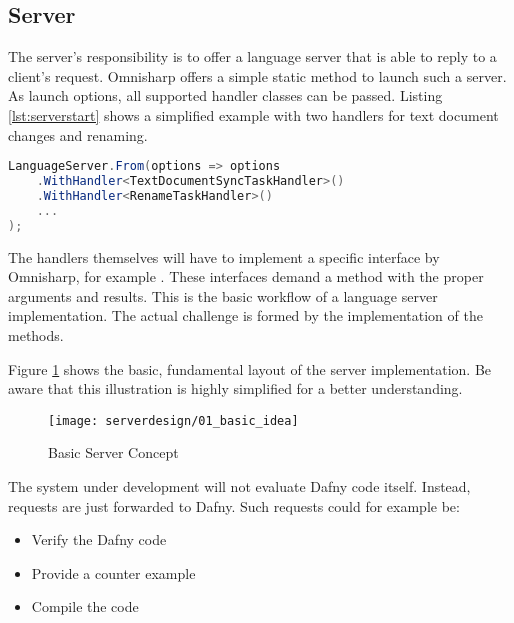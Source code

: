 
\subsection{Server}
The server's responsibility is to offer a language server that is able to reply to a client's request. Omnisharp offers a simple static method to launch such a server. As launch options, all supported handler classes can be passed. Listing \ref{lst:serverstart} shows a simplified example with two handlers for text document changes and renaming.

\begin{lstlisting}[language=csharp, caption={Language Server Initialization}, captionpos=b, label={lst:serverstart}]
LanguageServer.From(options => options
    .WithHandler<TextDocumentSyncTaskHandler>()
    .WithHandler<RenameTaskHandler>()
    ...
);
\end{lstlisting}

The handlers themselves will have to implement a specific interface by Omnisharp, for example . These interfaces demand a  method with the proper arguments and results. This is the basic workflow of a language server implementation. The actual challenge is formed by the implementation of the  methods.

Figure \ref{fig:server_basic_idea} shows the basic, fundamental layout of the server implementation. Be aware that this illustration is highly simplified for a better understanding.

\begin{figure}[H]
    \centering
    \texttt{[image: serverdesign/01\_basic\_idea]}
    \caption{Basic Server Concept}
    \label{fig:server_basic_idea}
\end{figure}

The system under development will not evaluate Dafny code itself. Instead, requests are just forwarded to Dafny. Such requests could for example be:
\begin{itemize}
    \item Verify the Dafny code
    \item Provide a counter example
    \item Compile the code
\end{itemize}

